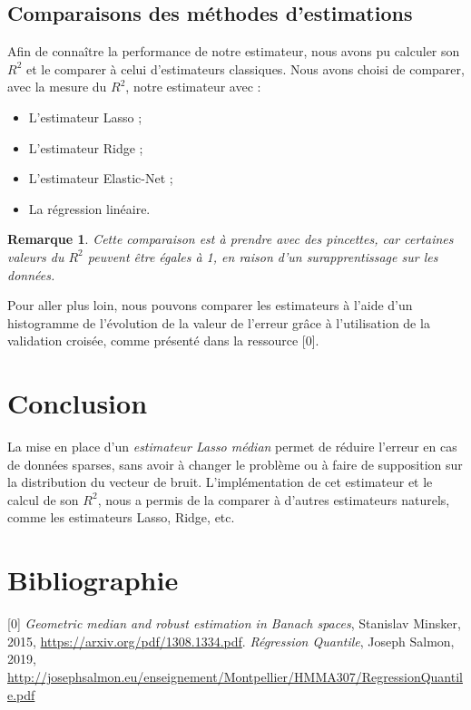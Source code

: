 \documentclass{article}
\newtheorem{remark}{Remarque}
\begin{document}
\subsection{Comparaisons des méthodes d'estimations}
Afin de connaître la performance de notre estimateur, nous avons pu calculer son $R^2$ et le comparer à celui d'estimateurs classiques. Nous avons choisi de comparer, avec la mesure du $R^2$, notre estimateur avec : 
\begin{itemize}
    \item L'estimateur Lasso ; 
    \item L'estimateur Ridge ;
    \item L'estimateur Elastic-Net ;
    \item La régression linéaire.
\end{itemize}
\vspace{0.1cm}
\begin{remark}
Cette comparaison est à prendre avec des pincettes, car certaines valeurs du $R^2$ peuvent être égales à 1, en raison d'un surapprentissage sur les données. 
\end{remark}
\vspace{0.1cm}
Pour aller plus loin, nous pouvons comparer les estimateurs à l'aide d'un histogramme de l'évolution de la valeur de l'erreur grâce à l'utilisation de la validation croisée, comme présenté dans la ressource [0].
\vspace{0.5cm}
\section*{Conclusion}
La mise en place d'un \textit{estimateur Lasso médian} permet de réduire l'erreur en cas de données sparses, sans avoir à changer le problème ou à faire de supposition sur la distribution du vecteur de bruit. L'implémentation de cet estimateur et le calcul de son $R^2$, nous a permis de la comparer à d'autres estimateurs naturels, comme les estimateurs Lasso, Ridge, etc. 

\pagebreak
{}
\section*{Bibliographie}
\label{sec:ref}
[0] \textit{Geometric median and robust estimation in Banach spaces}, Stanislav Minsker, 2015, \url{https://arxiv.org/pdf/1308.1334.pdf}.
\newline
[1] \textit{Régression Quantile}, Joseph Salmon, 2019, \url{http://josephsalmon.eu/enseignement/Montpellier/HMMA307/RegressionQuantile.pdf}
\end{document}
